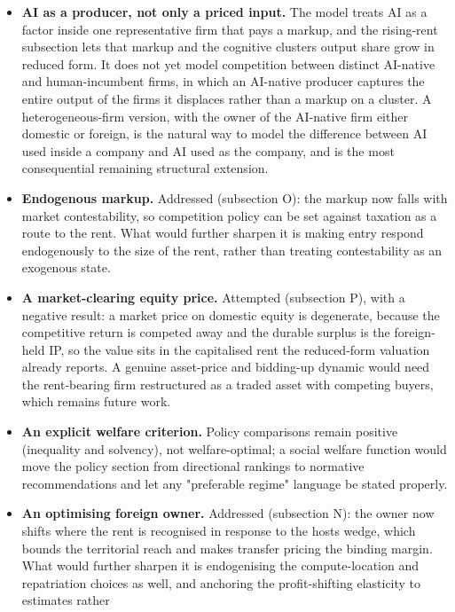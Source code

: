 \documentclass[11pt]{article}
\providecommand{\tightlist}{\setlength{\itemsep}{0pt}\setlength{\parskip}{0pt}}
\begin{document}
\begin{itemize}
\tightlist
\item
  \textbf{AI as a producer, not only a priced input.} The model treats
  AI as a factor inside one representative firm that pays a markup, and
  the rising-rent subsection lets that markup and the cognitive
  cluster\textquotesingle s output share grow in reduced form. It does
  not yet model competition between distinct AI-native and
  human-incumbent firms, in which an AI-native producer captures the
  entire output of the firms it displaces rather than a markup on a
  cluster. A heterogeneous-firm version, with the owner of the AI-native
  firm either domestic or foreign, is the natural way to model the
  difference between AI used inside a company and AI used as the
  company, and is the most consequential remaining structural extension.
\item
  \textbf{Endogenous markup.} Addressed (subsection O): the markup now
  falls with market contestability, so competition policy can be set
  against taxation as a route to the rent. What would further sharpen it
  is making entry respond endogenously to the size of the rent, rather
  than treating contestability as an exogenous state.
\item
  \textbf{A market-clearing equity price.} Attempted (subsection P),
  with a negative result: a market price on domestic equity is
  degenerate, because the competitive return is competed away and the
  durable surplus is the foreign-held IP, so the value sits in the
  capitalised rent the reduced-form valuation already reports. A genuine
  asset-price and bidding-up dynamic would need the rent-bearing firm
  restructured as a traded asset with competing buyers, which remains
  future work.
\item
  \textbf{An explicit welfare criterion.} Policy comparisons remain
  positive (inequality and solvency), not welfare-optimal; a social
  welfare function would move the policy section from directional
  rankings to normative recommendations and let any "preferable regime"
  language be stated properly.
\item
  \textbf{An optimising foreign owner.} Addressed (subsection N): the
  owner now shifts where the rent is recognised in response to the
  host\textquotesingle s wedge, which bounds the territorial reach and
  makes transfer pricing the binding margin. What would further sharpen
  it is endogenising the compute-location and repatriation choices as
  well, and anchoring the profit-shifting elasticity to estimates rather

\end{itemize}
\end{document}
